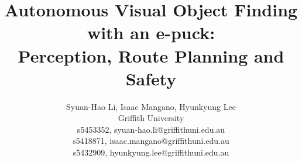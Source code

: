 \documentclass[10pt,twocolumn,letterpaper]{article}
\title{Autonomous Visual Object Finding with an e-puck:\\
Perception, Route Planning and Safety}
\author{
Syuan-Hao Li, Isaac Mangano, Hyunkyung Lee\\
Griffith University\\
{\small s5453352, syuan-hao.li@griffithuni.edu.au}\\
{\small s5418871, isaac.mangano@griffithuni.edu.au}\\
{\small s5432909, hyunkyung.lee@griffithuni.edu.au}
}
\begin{document}
\maketitle











{
    \small
    
    
}


\end{document}
